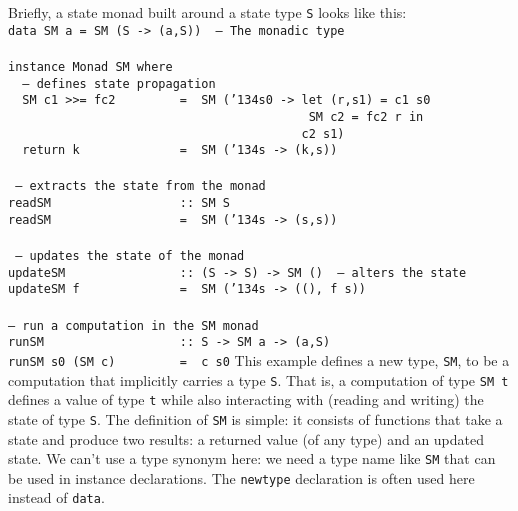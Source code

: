 Briefly, a state monad built around a state type \mbox{\tt S} looks
like this:
\bprog
\mbox{\tt data\ SM\ a\ =\ SM\ (S\ ->\ (a,S))\ \ --\ The\ monadic\ type}\\
\mbox{\tt }\\[-8pt]
\mbox{\tt instance\ Monad\ SM\ where}\\
\mbox{\tt \ \ --\ defines\ state\ propagation}\\
\mbox{\tt \ \ SM\ c1\ >>=\ fc2\ \ \ \ \ \ \ \ \ =\ \ SM\ ({\char'134}s0\ ->\ let\ (r,s1)\ =\ c1\ s0\ }\\
\mbox{\tt \ \ \ \ \ \ \ \ \ \ \ \ \ \ \ \ \ \ \ \ \ \ \ \ \ \ \ \ \ \ \ \ \ \ \ \ \ \ \ \ \ \ SM\ c2\ =\ fc2\ r\ in}\\
\mbox{\tt \ \ \ \ \ \ \ \ \ \ \ \ \ \ \ \ \ \ \ \ \ \ \ \ \ \ \ \ \ \ \ \ \ \ \ \ \ \ \ \ \ c2\ s1)}\\
\mbox{\tt \ \ return\ k\ \ \ \ \ \ \ \ \ \ \ \ \ \ =\ \ SM\ ({\char'134}s\ ->\ (k,s))}\\
\mbox{\tt }\\[-8pt]
\mbox{\tt \ --\ extracts\ the\ state\ from\ the\ monad}\\
\mbox{\tt readSM\ \ \ \ \ \ \ \ \ \ \ \ \ \ \ \ \ \ ::\ SM\ S}\\
\mbox{\tt readSM\ \ \ \ \ \ \ \ \ \ \ \ \ \ \ \ \ \ =\ \ SM\ ({\char'134}s\ ->\ (s,s))}\\
\mbox{\tt }\\[-8pt]
\mbox{\tt \ --\ updates\ the\ state\ of\ the\ monad}\\
\mbox{\tt updateSM\ \ \ \ \ \ \ \ \ \ \ \ \ \ \ \ ::\ (S\ ->\ S)\ ->\ SM\ ()\ \ --\ alters\ the\ state}\\
\mbox{\tt updateSM\ f\ \ \ \ \ \ \ \ \ \ \ \ \ \ =\ \ SM\ ({\char'134}s\ ->\ ((),\ f\ s))\ }\\
\mbox{\tt }\\[-8pt]
\mbox{\tt --\ run\ a\ computation\ in\ the\ SM\ monad}\\
\mbox{\tt runSM\ \ \ \ \ \ \ \ \ \ \ \ \ \ \ \ \ \ \ ::\ S\ ->\ SM\ a\ ->\ (a,S)}\\
\mbox{\tt runSM\ s0\ (SM\ c)\ \ \ \ \ \ \ \ \ =\ \ c\ s0}
\eprog
This example defines a new type, \mbox{\tt SM}, to be a computation that
implicitly carries a type \mbox{\tt S}.  That is, a computation of type \mbox{\tt SM\ t}
defines a value of type \mbox{\tt t} 
while also interacting with (reading and writing) the state of type
\mbox{\tt S}.  The definition of \mbox{\tt SM} is simple: it consists of functions that take a
state and produce two results: a returned value (of any type) and an
updated state.  We can't use a type synonym here: we need a type name
like \mbox{\tt SM} that can be used in instance declarations.  The \mbox{\tt newtype}
declaration is often used here instead of \mbox{\tt data}.

